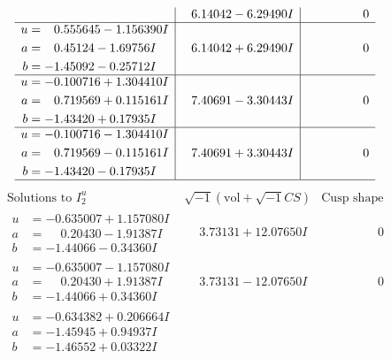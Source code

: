 \documentclass[1p]{elsarticle_modified}
\theoremstyle{definition}
\newcommand{\I}{\sqrt{-1}}
\begin{document}
$$\begin{array}{c|c|c}
 & \phantom{-}6.14042 - 6.29490 I & \phantom{-0.000000 } 0 \\ \hline\begin{aligned}
u &= \phantom{-}0.555645 - 1.156390 I \\
a &= \phantom{-}0.45124 - 1.69756 I \\
b &= -1.45092 - 0.25712 I\end{aligned}
 & \phantom{-}6.14042 + 6.29490 I & \phantom{-0.000000 } 0 \\ \hline\begin{aligned}
u &= -0.100716 + 1.304410 I \\
a &= \phantom{-}0.719569 + 0.115161 I \\
b &= -1.43420 + 0.17935 I\end{aligned}
 & \phantom{-}7.40691 - 3.30443 I & \phantom{-0.000000 } 0 \\ \hline\begin{aligned}
u &= -0.100716 - 1.304410 I \\
a &= \phantom{-}0.719569 - 0.115161 I \\
b &= -1.43420 - 0.17935 I\end{aligned}
 & \phantom{-}7.40691 + 3.30443 I & \phantom{-0.000000 } 0\\
 \hline 
 \end{array}$$\newpage$$\begin{array}{c|c|c}  
\text{Solutions to }I^u_{2}& \I (\text{vol} + \sqrt{-1}CS) & \text{Cusp shape}\\
 \hline 
\begin{aligned}
u &= -0.635007 + 1.157080 I \\
a &= \phantom{-}0.20430 - 1.91387 I \\
b &= -1.44066 - 0.34360 I\end{aligned}
 & \phantom{-}3.73131 + 12.07650 I & \phantom{-0.000000 } 0 \\ \hline\begin{aligned}
u &= -0.635007 - 1.157080 I \\
a &= \phantom{-}0.20430 + 1.91387 I \\
b &= -1.44066 + 0.34360 I\end{aligned}
 & \phantom{-}3.73131 - 12.07650 I & \phantom{-0.000000 } 0 \\ \hline\begin{aligned}
u &= -0.634382 + 0.206664 I \\
a &= -1.45945 + 0.94937 I \\
b &= -1.46552 + 0.03322 I\end{aligned}

\end{array}$$
\end{document}
